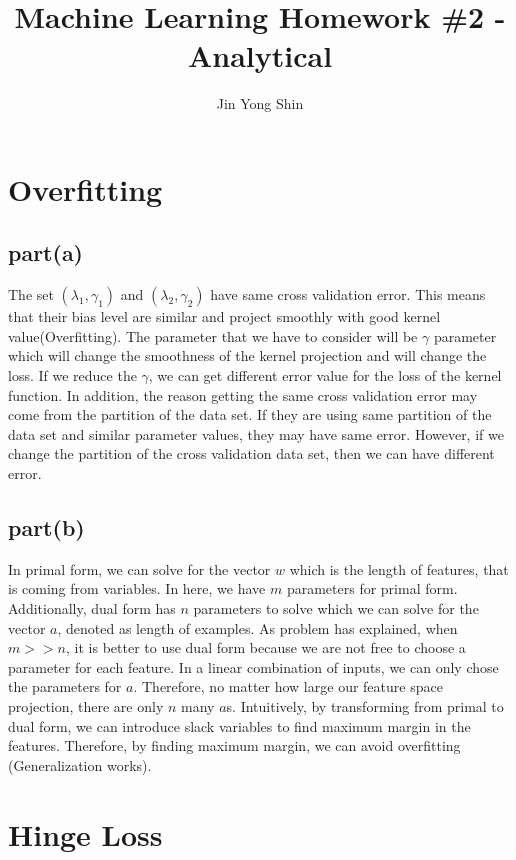 \documentclass{article}
\begin{document}
\title{Machine Learning Homework \#2 - Analytical}
\author{Jin Yong Shin}
\maketitle
\newpage
\section{Overfitting}
\subsection{part(a)}
The set $(\lambda_1, \gamma_1)$ and $(\lambda_2, \gamma_2)$ have same cross validation error. This means that their bias level are similar and project smoothly with good kernel value(Overfitting). The parameter that we have to consider will be $\gamma$ parameter which will change the smoothness of the kernel projection and will change the loss. If we reduce the $\gamma$, we can get different error value for the loss of the kernel function. In addition, the reason getting the same cross validation error may come from the partition of the data set. If they are using same partition of the data set and similar parameter values, they may have same error. However, if we change the partition of the cross validation data set, then we can have different error.
\subsection{part(b)}
In primal form, we can solve for the vector $w$ which is the length of features, that is coming from variables. In here, we have $m$ parameters for primal form. Additionally, dual form has $n$ parameters to solve which we can solve for the vector $a$, denoted as length of examples. As problem has explained, when $m >> n$, it is better to use dual form because we are not free to choose a parameter for each feature. In a linear combination of inputs, we can only chose the parameters for $a$. Therefore, no matter how large our feature space projection, there are only $n$ many $a$s. Intuitively, by transforming from primal to dual form, we can introduce slack variables to find maximum margin in the features. Therefore, by finding maximum margin, we can avoid overfitting (Generalization works).

\newpage
\section{Hinge Loss}
\end{document}
